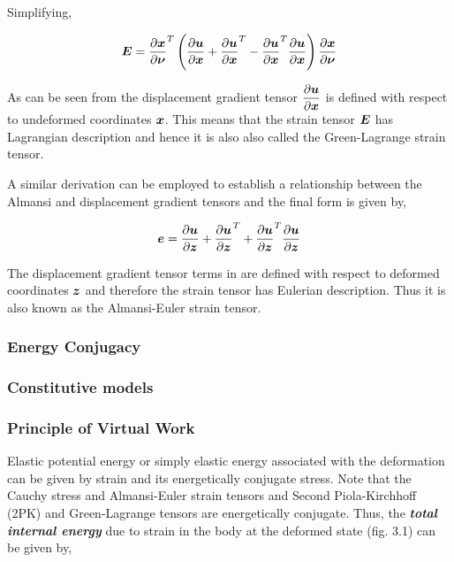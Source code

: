 \noindent Simplifying,

\begin{equation}
  \matr{E}=\transpose{\delby{\vect{x}}{\vect{\nu}}}
           \pbrac{\delby{\vect{u}}{\vect{x}}+\transpose{\delby{\vect{u}}{\vect{x}}}-
	   \transpose{\delby{\vect{u}}{\vect{x}}}\delby{\vect{u}}{\vect{x}}}
	   \delby{\vect{x}}{\vect{\nu}}
  \label{eqn:greendisplacement2}
\end{equation}
 
As can be seen from  the displacement gradient tensor $\delby{\vect{u}}{\vect{x}}$ is defined with respect to 
undeformed coordinates $\vect{x}$. This means that the strain tensor $\matr{E}$ has Lagrangian description and hence it is also also called 
the Green-Lagrange strain tensor. 
 
A similar derivation can be employed to establish a relationship between the Almansi and displacement gradient tensors and the final
form is given by,

\begin{equation}
  \vect{e}=\delby{\vect{u}}{\vect{z}}+\transpose{\delby{\vect{u}}{\vect{z}}}+
	   \transpose{\delby{\vect{u}}{\vect{z}}}\delby{\vect{u}}{\vect{z}}
  \label{eqn:almansidisplacement}
\end{equation}
 
The displacement gradient tensor terms in  are defined with respect to deformed coordinates $\vect{z}$ and
therefore the strain tensor has Eulerian description. Thus it is also known as the Almansi-Euler strain tensor.

\subsubsection{Energy Conjugacy}



\subsubsection{Constitutive models}



\subsubsection{Principle of Virtual Work}
Elastic potential energy or simply elastic energy associated with the deformation can be given by strain and its energetically conjugate stress. 
Note that the Cauchy stress and Almansi-Euler strain tensors and Second Piola-Kirchhoff (2PK) and Green-Lagrange tensors are energetically 
conjugate. Thus, the \textit{\textbf{total internal energy}} due to strain in the body at the deformed state (fig. 3.1) can be given by,
 

